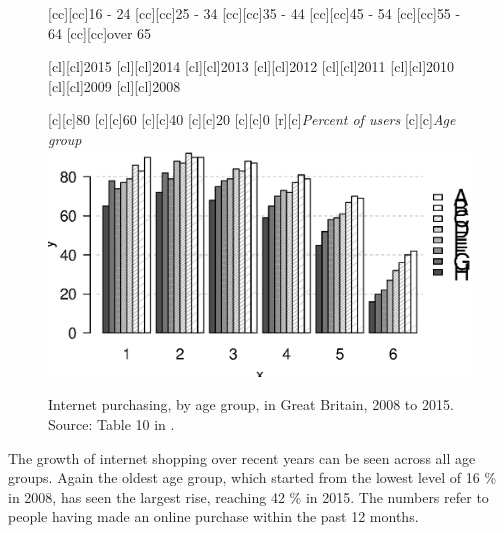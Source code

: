 \documentclass[11 pt, a4paper]{report}
\begin{document}
\begin{figure}[hbtp!]
[cc][cc]{\small{16 - 24}}
[cc][cc]{\small{25 - 34}}
[cc][cc]{\small{35 - 44}}
[cc][cc]{\small{45 - 54}}
[cc][cc]{\small{55 - 64}}
[cc][cc]{\small{over 65}}

[cl][cl]{\small{2015}}
[cl][cl]{\small{2014}}
[cl][cl]{\small{2013}}
[cl][cl]{\small{2012}}
[cl][cl]{\small{2011}}
[cl][cl]{\small{2010}}
[cl][cl]{\small{2009}}
[cl][cl]{\small{2008}}


[c][c]{\small{80}}
[c][c]{\small{60}}
[c][c]{\small{40}}
[c][c]{\small{20}}
[c][c]{\small{0}}
[r][c]{\small{\emph{Percent of users}}}
[c][c]{\small{\emph{Age group}}}
\includegraphics[width=\textwidth]{../figures/Fig7.4.eps}
\caption{Internet purchasing, by age group, in Great Britain, 2008 to 2015. Source: Table 10 in \citet{ONS2015}.}\label{Fig:21} %
\end{figure}

The growth of internet shopping over recent years can be seen across all age groups. Again the oldest age group, which started from the lowest level of 16 \% in 2008, has seen the largest rise, reaching  42 \% in 2015. The numbers refer to people having made an online purchase within the past 12 months. 
\end{document}
